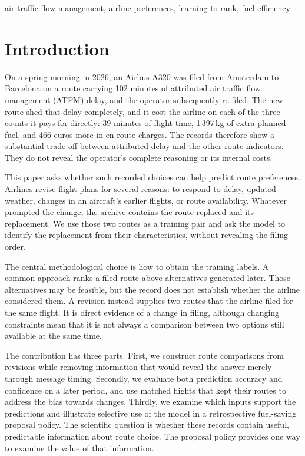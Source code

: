 \documentclass[conference,10pt,a4paper,IEEEoverridecommandlockouts]{IEEEtran}
\begin{document}
\begin{IEEEkeywords}
air traffic flow management, airline preferences, learning to rank,
fuel efficiency
\end{IEEEkeywords}

\section{Introduction}
\label{sec:intro}

On a spring morning in 2026, an Airbus A320 was filed from Amsterdam to
Barcelona on a route carrying 102 minutes of attributed air traffic flow
management (ATFM) delay, and the operator subsequently re-filed. The new
route shed that delay completely, and it cost the airline on each of the
three counts it pays for directly: 39 minutes of flight time,
1\,397\,kg of extra planned fuel, and 466 euros more in en-route charges.
The records therefore show a substantial trade-off between attributed
delay and the other route indicators. They do not reveal the operator's
complete reasoning or its internal costs.

This paper asks whether such recorded choices can help predict route
preferences. Airlines revise flight plans for several reasons: to respond
to delay, updated weather, changes in an aircraft's earlier flights, or
route availability. Whatever prompted the change, the archive contains
the route replaced and its replacement. We use those two routes as a
training pair and ask the model to identify the replacement from their
characteristics, without revealing the filing order.

The central methodological choice is how to obtain the training labels.
A common approach ranks a filed route above alternatives generated later.
Those alternatives may be feasible, but the record does not establish
whether the airline considered them. A revision instead supplies two
routes that the airline filed for the same flight. It is direct evidence
of a change in filing, although changing constraints mean that it is not
always a comparison between two options still available at the same time.

The contribution has three parts. First, we construct route comparisons
from revisions while removing information that would reveal the answer
merely through message timing. Secondly, we evaluate both prediction
accuracy and confidence on a later period, and use matched flights that
kept their routes to address the bias towards changes. Thirdly, we examine
which inputs support the predictions and illustrate selective use of the
model in a retrospective fuel-saving proposal policy. The scientific
question is whether these records contain useful, predictable information
about route choice. The proposal policy provides one way to examine the
value of that information.
\end{document}
